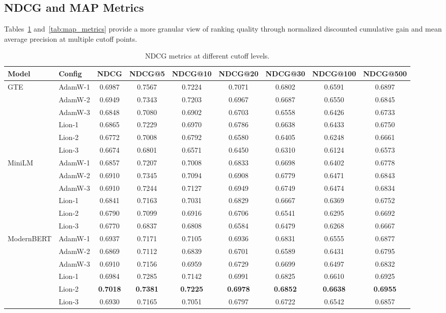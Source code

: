 \documentclass[conference]{IEEEtran}
\begin{document}
\subsection{NDCG and MAP Metrics}
Tables~\ref{tab:ndcg_metrics} and~\ref{tab:map_metrics} provide a more granular view of ranking quality through normalized discounted cumulative gain and mean average precision at multiple cutoff points.

\begin{table}[t]
\centering
\caption{NDCG metrics at different cutoff levels.}
\label{tab:ndcg_metrics}
\small
\begin{tabular}{llccccccc}
\toprule
\textbf{Model} & \textbf{Config} & \textbf{NDCG} & \textbf{NDCG@5} & \textbf{NDCG@10} & \textbf{NDCG@20} & \textbf{NDCG@30} & \textbf{NDCG@100} & \textbf{NDCG@500} \\
\midrule
\multirow{6}{*}{GTE} & AdamW-1 & 0.6987 & 0.7567 & 0.7224 & 0.7071 & 0.6802 & 0.6591 & 0.6897 \\
 & AdamW-2 & 0.6949 & 0.7343 & 0.7203 & 0.6967 & 0.6687 & 0.6550 & 0.6845 \\
 & AdamW-3 & 0.6848 & 0.7080 & 0.6902 & 0.6703 & 0.6558 & 0.6426 & 0.6733 \\
 & Lion-1 & 0.6865 & 0.7229 & 0.6970 & 0.6786 & 0.6638 & 0.6433 & 0.6750 \\
 & Lion-2 & 0.6772 & 0.7008 & 0.6792 & 0.6580 & 0.6405 & 0.6248 & 0.6661 \\
 & Lion-3 & 0.6674 & 0.6801 & 0.6571 & 0.6450 & 0.6310 & 0.6124 & 0.6573 \\
\midrule
\multirow{6}{*}{MiniLM} & AdamW-1 & 0.6857 & 0.7207 & 0.7008 & 0.6833 & 0.6698 & 0.6402 & 0.6778 \\
 & AdamW-2 & 0.6910 & 0.7345 & 0.7094 & 0.6908 & 0.6779 & 0.6471 & 0.6843 \\
 & AdamW-3 & 0.6910 & 0.7244 & 0.7127 & 0.6949 & 0.6749 & 0.6474 & 0.6834 \\
 & Lion-1 & 0.6841 & 0.7163 & 0.7031 & 0.6829 & 0.6667 & 0.6369 & 0.6752 \\
 & Lion-2 & 0.6790 & 0.7099 & 0.6916 & 0.6706 & 0.6541 & 0.6295 & 0.6692 \\
 & Lion-3 & 0.6770 & 0.6837 & 0.6808 & 0.6584 & 0.6479 & 0.6268 & 0.6667 \\
\midrule
\multirow{6}{*}{ModernBERT} & AdamW-1 & 0.6937 & 0.7171 & 0.7105 & 0.6936 & 0.6831 & 0.6555 & 0.6877 \\
 & AdamW-2 & 0.6869 & 0.7112 & 0.6839 & 0.6701 & 0.6589 & 0.6431 & 0.6795 \\
 & AdamW-3 & 0.6910 & 0.7156 & 0.6959 & 0.6729 & 0.6699 & 0.6497 & 0.6832 \\
 & Lion-1 & 0.6984 & 0.7285 & 0.7142 & 0.6991 & 0.6825 & 0.6610 & 0.6925 \\
 & Lion-2 & \textbf{0.7018} & \textbf{0.7381} & \textbf{0.7225} & \textbf{0.6978} & \textbf{0.6852} & \textbf{0.6638} & \textbf{0.6955} \\
 & Lion-3 & 0.6930 & 0.7165 & 0.7051 & 0.6797 & 0.6722 & 0.6542 & 0.6857 \\
\bottomrule
\end{tabular}
\end{table}
\end{document}

